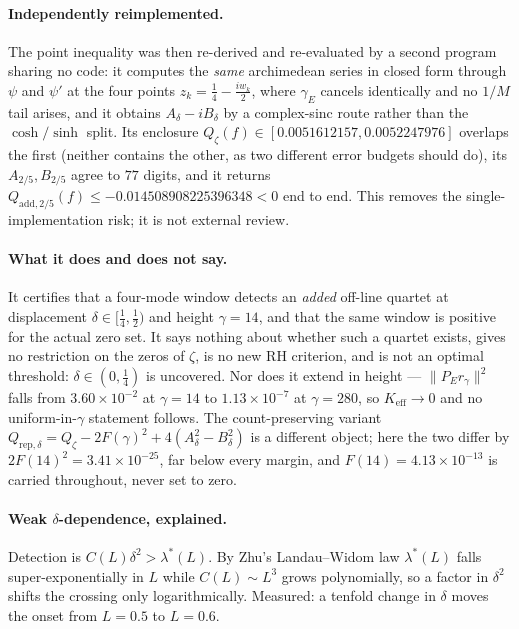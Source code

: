 \documentclass[11pt,a4paper]{article}
\theoremstyle{definition}
\theoremstyle{remark}
\newcommand{\lstar}{\lambda^{*}}
\begin{document}
\paragraph{Independently reimplemented.} The point inequality was then re-derived and
re-evaluated by a second program sharing no code: it computes the \emph{same} archimedean
series in closed form through $\psi$ and $\psi'$ at the four points $z_k=\tfrac14-\tfrac{iw_k}2$,
where $\gamma_E$ cancels identically and no $1/M$ tail arises, and it obtains $A_\delta-iB_\delta$
by a complex-sinc route rather than the $\cosh/\sinh$ split. Its enclosure
$Q_\zeta(f)\in[0.0051612157,0.0052247976]$ overlaps the first (neither contains the other,
as two different error budgets should do), its $A_{2/5},B_{2/5}$ agree to $77$ digits, and it
returns $Q_{\mathrm{add},2/5}(f)\le-0.014508908225396348<0$ end to end. This removes the
single-implementation risk; it is not external review.

\paragraph{What it does and does not say.} It certifies that a four-mode window detects an
\emph{added} off-line quartet at displacement $\delta\in[\tfrac14,\tfrac12)$ and height
$\gamma=14$, and that the same window is positive for the actual zero set. It says nothing
about whether such a quartet exists, gives no restriction on the zeros of $\zeta$, is no new
RH criterion, and is not an optimal threshold: $\delta\in(0,\tfrac14)$ is uncovered. Nor
does it extend in height --- $\|P_Er_\gamma\|^{2}$ falls from $3.60\times10^{-2}$ at
$\gamma=14$ to $1.13\times10^{-7}$ at $\gamma=280$, so $K_{\mathrm{eff}}\to0$ and no
uniform-in-$\gamma$ statement follows. The count-preserving variant
$Q_{\mathrm{rep},\delta}=Q_\zeta-2F(\gamma)^{2}+4(A_\delta^{2}-B_\delta^{2})$ is a different
object; here the two differ by $2F(14)^{2}=3.41\times10^{-25}$, far below every margin, and
$F(14)=4.13\times10^{-13}$ is carried throughout, never set to zero.

\paragraph{Weak $\delta$-dependence, explained.} Detection is
$C(L)\delta^{2}>\lstar(L)$. By Zhu's Landau--Widom law $\lstar(L)$ falls
super-exponentially in $L$ while $C(L)\sim L^{3}$ grows polynomially, so a factor in
$\delta^{2}$ shifts the crossing only logarithmically. Measured: a tenfold change in
$\delta$ moves the onset from $L=0.5$ to $L=0.6$.
\end{document}
